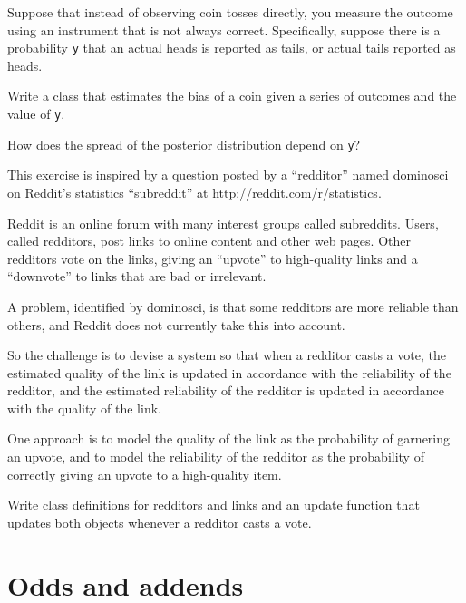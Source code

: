 \documentclass[12pt]{book}
\begin{document}
\begin{exercise}

Suppose that instead of observing coin tosses directly, you measure
the outcome using an instrument that is not always correct.  Specifically,
suppose there is a probability {\tt y} that an actual heads is reported
as tails, or actual tails reported as heads.

Write a class that estimates the bias of a coin given a series of
outcomes and the value of {\tt y}.

How does the spread of the posterior distribution depend on
{\tt y}?

\end{exercise}


\begin{exercise}

This exercise is inspired by a question posted by a
``redditor'' named dominosci on Reddit's statistics ``subreddit'' at
\url{http://reddit.com/r/statistics}.

Reddit is an online forum with many interest groups called
subreddits.  Users, called redditors, post links to online
content and other web pages.  Other redditors vote on the links,
giving an ``upvote'' to high-quality links and a ``downvote'' to
links that are bad or irrelevant.

A problem, identified by dominosci, is that some redditors
are more reliable than others, and Reddit does not currently take
this into account.

So the challenge is to devise a system so that when a redditor
casts a vote, the estimated quality of the link is updated
in accordance with the reliability of the redditor, and the
estimated reliability of the redditor is updated in accordance
with the quality of the link.

One approach is to model the quality of the link as the
probability of garnering an upvote, and to model the reliability
of the redditor as the probability of correctly giving an upvote
to a high-quality item.

Write class definitions for redditors and links and an update function
that updates both objects whenever a redditor casts a vote.

\end{exercise}



\chapter{Odds and addends}
\end{document}
